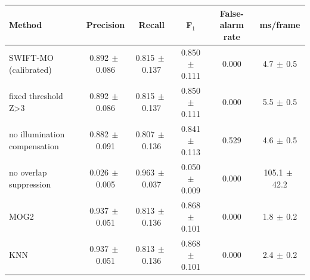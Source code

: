 \begin{tabular}{lccccc}\toprule
Method & Precision & Recall & F$_1$ & False-alarm rate & ms/frame \\\midrule
SWIFT-MO (calibrated) & 0.892$\,\pm\,$0.086 & 0.815$\,\pm\,$0.137 & 0.850$\,\pm\,$0.111 & 0.000 & 4.7$\,\pm\,$0.5 \\
fixed threshold Z>3 & 0.892$\,\pm\,$0.086 & 0.815$\,\pm\,$0.137 & 0.850$\,\pm\,$0.111 & 0.000 & 5.5$\,\pm\,$0.5 \\
no illumination compensation & 0.882$\,\pm\,$0.091 & 0.807$\,\pm\,$0.136 & 0.841$\,\pm\,$0.113 & 0.529 & 4.6$\,\pm\,$0.5 \\
no overlap suppression & 0.026$\,\pm\,$0.005 & 0.963$\,\pm\,$0.037 & 0.050$\,\pm\,$0.009 & 0.000 & 105.1$\,\pm\,$42.2 \\
MOG2 & 0.937$\,\pm\,$0.051 & 0.813$\,\pm\,$0.136 & 0.868$\,\pm\,$0.101 & 0.000 & 1.8$\,\pm\,$0.2 \\
KNN & 0.937$\,\pm\,$0.051 & 0.813$\,\pm\,$0.136 & 0.868$\,\pm\,$0.101 & 0.000 & 2.4$\,\pm\,$0.2 \\
\bottomrule\end{tabular}
